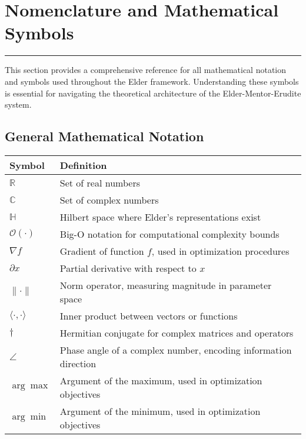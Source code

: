 \chapter*{Nomenclature and Mathematical Symbols}

\begin{center}
\rule{0.5\textwidth}{0.5pt}
\end{center}

\vspace{0.5cm}
\noindent This section provides a comprehensive reference for all mathematical notation and symbols used throughout the Elder framework. Understanding these symbols is essential for navigating the theoretical architecture of the Elder-Mentor-Erudite system.

\section*{General Mathematical Notation}
\begin{center}
\begin{tabular}{>{\centering\arraybackslash}p{3cm} p{10cm}}
\hline
\textbf{Symbol} & \textbf{Definition} \\
\hline
$\mathbb{R}$ & Set of real numbers \\
$\mathbb{C}$ & Set of complex numbers \\
$\mathbb{H}$ & Hilbert space where Elder's representations exist \\
$\mathcal{O}(\cdot)$ & Big-O notation for computational complexity bounds \\
$\nabla f$ & Gradient of function $f$, used in optimization procedures \\
$\partial x$ & Partial derivative with respect to $x$ \\
$\| \cdot \|$ & Norm operator, measuring magnitude in parameter space \\
$\langle \cdot, \cdot \rangle$ & Inner product between vectors or functions \\
$\dagger$ & Hermitian conjugate for complex matrices and operators \\
$\angle$ & Phase angle of a complex number, encoding information direction \\
$\arg\max$ & Argument of the maximum, used in optimization objectives \\
$\arg\min$ & Argument of the minimum, used in optimization objectives \\
\hline
\end{tabular}
\end{center}

